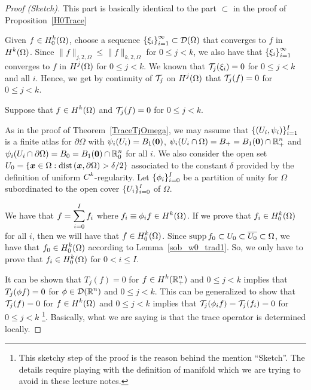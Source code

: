 \begin{proof}[Proof (Sketch)]
\subI{$\mathbf{\subset}$}  This part is basically identical to the
part $\mathbf{\subset}$ in the proof of Proposition~\ref{H0Trace}

Given $\displaystyle f \in H^k_0(\Omega)$, choose a sequence
$\displaystyle \left\{\xi_i\right\}_{i=1}^\infty \subset \mathcal{D}(\Omega)$
that converges to $f$ in $\displaystyle H^k(\Omega)$.
Since $\|f\|_{j,2,\Omega} \leq \|f\|_{k,2,\Omega}$ for $0\leq j < k$,
we also have that $\displaystyle \left\{\xi_i\right\}_{i=1}^\infty$
converges to $f$ in $\displaystyle H^j(\Omega)$ 
for $0\leq j < k$.  We known that $\mathcal{T}_j(\xi_i) = 0$ for $0 \leq j < k$
and all $i$.  Hence, we get by continuity of $\mathcal{T}_j$ on
$\displaystyle H^j(\Omega)$ that $\mathcal{T}_j(f) = 0$ for $0 \leq j < k$.

\subI{$\mathbf{\supset}$}
Suppose that $\displaystyle f \in H^k(\Omega)$ and
$\mathcal{T}_j(f) = 0$ for $0 \leq j < k$.

As in the proof of Theorem~\ref{TraceTjOmega}, we may assume that
$\displaystyle \{ (U_i,\psi_i) \}_{i=1}^I$ is a finite atlas for
$\partial \Omega$ with $\psi_i(U_i) = B_1({\bm{0}})$,
$\displaystyle \psi_i(U_i \cap \Omega) = B_+ = B_1({\bm{0}}) \cap \mathbb{R}^n_+$
and
$\displaystyle \psi_i(U_i \cap \partial \Omega) = B_0 = B_1({\bm{0}})
\cap \mathbb{R}^n_0$ for all $i$.  We also consider the open set
$\displaystyle U_0 = \left\{ {\bm{x}} \in \Omega :
\mathrm{dist}\left({\bm{x}},\partial \Omega\right)  > \delta/2 \right\}$
associated to the constant $\delta$ provided by the definition
of uniform $\displaystyle C^k$-regularity.
Let $\displaystyle \{ \phi_i \}_{i=0}^I$ be a partition of unity for
$\Omega$ subordinated to the open cover $\displaystyle \{ U_i \}_{i=0}^I$
of $\Omega$.

We have that $\displaystyle f = \sum_{i=0}^I f_i$ where
$\displaystyle f_i \equiv \phi_i f \in H^k(\Omega)$.  If we prove that
$\displaystyle f_i \in H^k_0(\Omega)$ for all $i$, then we will
have that $\displaystyle f \in H^k_0(\Omega)$.
Since $\operatorname{supp} f_0 \subset U_0 \subset \overline{U_0} \subset \Omega$, we
have that $\displaystyle f_0 \in H^k_0(\Omega)$ according to
Lemma~\ref{sob_w0_trad1}.  So, we only have to prove
that $\displaystyle f_i \in H^k_0(\Omega)$ for $0 < i \leq I$.

It can be shown that $T_j(f) = 0$ for
$\displaystyle f \in H^k(\mathbb{R}_+^n)$ and $0 \leq j <k$
implies that $\displaystyle T_j(\phi f) = 0$ for
$\displaystyle \phi \in \mathcal{D}(\mathbb{R}^n)$ and $0 \leq j <k$.   This can be
generalized to show that $\mathcal{T}_j(f) = 0$ for
$\displaystyle f \in H^k(\Omega)$ and $0 \leq j <k$
implies that $\displaystyle \mathcal{T}_j(\phi_i f) = \mathcal{T}_j(f_i) = 0$ for
$0 \leq j <k$ \footnote{This sketchy step of the proof is the reason behind
the mention ``Sketch''.  The details require playing with the
definition of manifold which we are trying to avoid in these lecture notes.}.
Basically, what we are saying is that the trace operator is
determined locally.


\end{proof}
